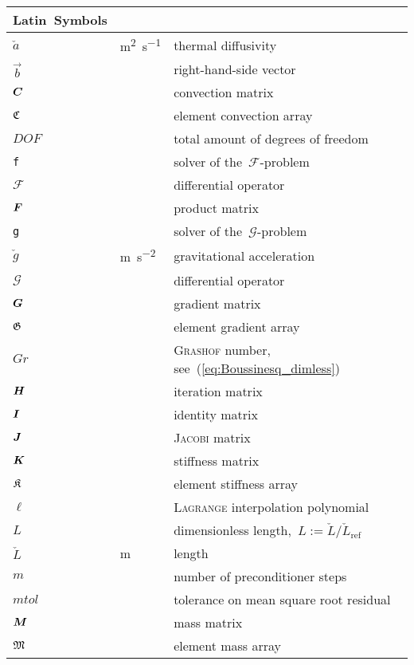 \begin{longtable}{@{}p{} p{} p{}}
\mbox{Latin Symbols}\\\hline
$\check{a}$ & \si{\m\squared\per\s} & thermal diffusivity\\
$\vec{b}$ & ~ & right-hand-side vector\\
$\boldsymbol{C}$ & ~ & convection matrix\\
$\mathfrak{C}$ & ~ & element convection array\\
$DOF$ & ~ & total amount of degrees of freedom\\
\texttt{f} & ~ & solver of the~$\mathcal{F}$-problem\\
$\mathcal{F}$ & ~ & differential operator\\
$\boldsymbol{F}$ & ~ & product matrix\\
\texttt{g} & ~ & solver of the~$\mathcal{G}$-problem\\
$\check{g}$ & \si{\m\per\s\squared} & gravitational acceleration\\
$\mathcal{G}$ & ~ & differential operator\\
$\boldsymbol{G}$ & ~ & gradient matrix\\
$\mathfrak{G}$ & ~ & element gradient array\\
$Gr$ & ~ & \textsc{Grashof} number, see~(\ref{eq:Boussinesq_dimless})\\
$\boldsymbol{H}$ & ~ & iteration matrix\\
$\boldsymbol{I}$ & ~ & identity matrix\\
$\boldsymbol{J}$ & ~ & \textsc{Jacobi} matrix\\
$\boldsymbol{K}$ & ~ & stiffness matrix\\
$\mathfrak{K}$ & ~ & element stiffness array\\
$\ell$ & ~ & \textsc{Lagrange} interpolation polynomial\\
$L$ & ~ & dimensionless length,~$L := \check{L}/\check{L}_\text{ref}$\\
$\check{L}$ & \si{\m} & length\\
$m$ & ~ & number of preconditioner steps\\
$mtol$ & ~ & tolerance on mean square root residual\\
$\boldsymbol{M}$ & ~ & mass matrix\\
$\mathfrak{M}$ & ~ & element mass array\\

\end{longtable}
